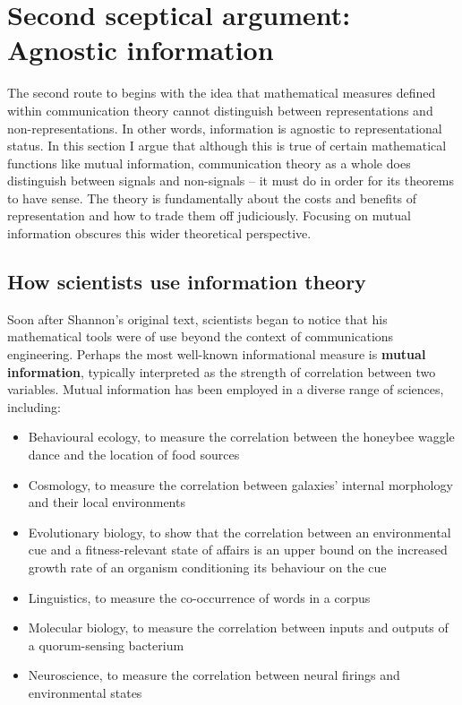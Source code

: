 \documentclass[12pt]{article}
\begin{document}

\section{Second sceptical argument: Agnostic information}\label{sec:agnostic}

The second route to \tic{} begins with the idea that mathematical measures defined within communication theory cannot distinguish between representations and non-representations.
In other words, information is agnostic to representational status.
In this section I argue that although this is true of certain mathematical functions like mutual information, communication theory as a whole does distinguish between signals and non-signals -- it must do in order for its theorems to have sense.
The theory is fundamentally about the costs and benefits of representation and how to trade them off judiciously.
Focusing on mutual information obscures this wider theoretical perspective.

\subsection{How scientists use information theory}\label{subsec:scientists}

Soon after Shannon's original text, scientists began to notice that his mathematical tools were of use beyond the context of communications engineering.
Perhaps the most well-known informational measure is \textbf{mutual information}, typically interpreted as the strength of correlation between two variables.
Mutual information has been employed in a diverse range of sciences, including:

\begin{itemize}
    \item Behavioural ecology, to measure the correlation between the honeybee waggle dance and the location of food sources \citep{haldane1954statistical}
    \item Cosmology, to measure the correlation between galaxies' internal morphology and their local environments \citep{pandey2017how}
    \item Evolutionary biology, to show that the correlation between an environmental cue and a fitness-relevant state of affairs is an upper bound on the increased growth rate of an organism conditioning its behaviour on the cue \citep{donaldson-matasci2010fitness}
    \item Linguistics, to measure the co-occurrence of words in a corpus \citep[$\S$4]{hunston2002corpora}
    \item Molecular biology, to measure the correlation between inputs and outputs of a quorum-sensing bacterium \citep{mehta2009information}
    \item Neuroscience, to measure the correlation between neural firings and environmental states \citep[][and references therein]{rathkopf2017neural}
\end{itemize}
\end{document}
